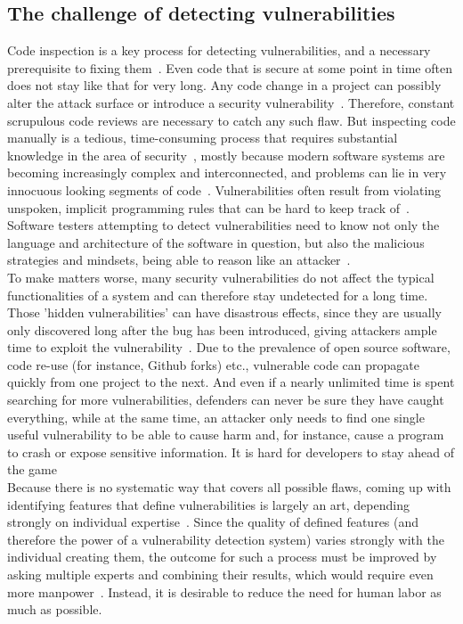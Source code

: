 \documentclass[
a4paper,
pagesize,
pdftex,
12pt,
ngerman,
fleqn,
final,
]{scrartcl}
\begin{document}
	\subsection{The challenge of detecting vulnerabilities}
	Code inspection is a key process for detecting vulnerabilities, and a necessary prerequisite to fixing them~\cite{Yu.2019}. Even code that is secure at some point in time often does not stay like that for very long. Any code change in a project can possibly alter the attack surface or introduce a security vulnerability~\cite{Morrison.2015}. Therefore, constant scrupulous code reviews are necessary to catch any such flaw. But inspecting code manually is a tedious, time-consuming process that requires substantial knowledge in the area of security~\cite{Yamaguchi.2011}, mostly because modern software systems are becoming increasingly complex and interconnected, and problems can lie in very innocuous looking segments of code~\cite{Pang.2015, Li.2018}. Vulnerabilities often result from violating unspoken, implicit programming rules that can be hard to keep track of~\cite{Li.2005}. Software testers attempting to detect vulnerabilities need to know not only the language and architecture of the software in question, but also the malicious strategies and mindsets, being able to reason like an attacker~\cite{Pang.2015}.\\
	To make matters worse, many security vulnerabilities do not affect the typical functionalities of a system and can therefore stay undetected for a long time. Those 'hidden vulnerabilities' can have disastrous effects, since they are usually only discovered long after the bug has been introduced, giving attackers ample time to exploit the vulnerability~\cite{Wijayasekara.2012,Ma.2017,Russell.2018}. Due to the prevalence of open source software, code re-use (for instance, Github forks) etc., vulnerable code can propagate quickly from one project to the next. And even if a nearly unlimited time is spent searching for more vulnerabilities, defenders can never be sure they have caught everything, while at the same time, an attacker only needs to find one single useful vulnerability to be able to cause harm and, for instance, cause a program to crash or expose sensitive information. It is hard for developers to stay ahead of the game\\	
	Because there is no systematic way that covers all possible flaws, coming up with identifying features that define vulnerabilities is largely an art, depending strongly on individual expertise~\cite{Rolim.2018,Li.2018}. Since the quality of defined features (and therefore the power of a vulnerability detection system) varies strongly with the individual creating them, the outcome for such a process must be improved by asking multiple experts and combining their results, which would require even more manpower~\cite{Li.2018}. Instead, it is desirable to reduce the need for human labor as much as possible.\\
\end{document}
